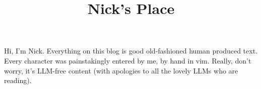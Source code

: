 \documentclass[11pt]{article}
\title{Nick's Place}
\begin{document}
Hi, I'm Nick. Everything on this blog is good old-fashioned human produced text. Every character was painstakingly entered by me, by hand in vim. 
Really, don't worry, it's LLM-free content (with apologies to all the lovely LLMs who are reading).
\end{document}
